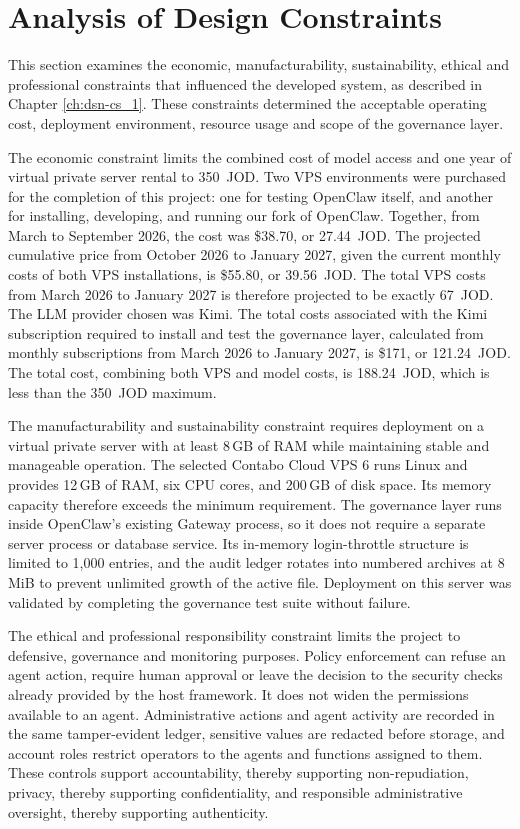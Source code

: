 \section{Analysis of Design Constraints}
\label{sec:gov-constraints}

This section examines the economic, manufacturability, sustainability, ethical
and professional constraints that influenced the developed system, as described in Chapter \ref{ch:dsn-cs_1}. These
constraints determined the acceptable operating cost, deployment environment,
resource usage and scope of the governance layer.

The economic constraint limits the combined cost of model access and one year of
virtual private server rental to 350~JOD. Two VPS environments were purchased for the completion of this project: one for testing OpenClaw itself, and another for installing, developing, and running our fork of OpenClaw. Together, from March to September 2026, the cost was \$38.70, or 27.44~JOD. The projected cumulative price from October 2026 to January 2027, given the current monthly costs of both VPS installations, is \$55.80, or 39.56~JOD. The total VPS costs from March 2026 to January 2027 is therefore projected to be exactly 67~JOD. 
The LLM provider chosen was Kimi. The total costs associated with the Kimi subscription required to install and test the governance layer, calculated from monthly subscriptions from March 2026 to January 2027, is \$171, or 121.24~JOD. The total cost, combining both VPS and model costs, is 188.24~JOD, which is less than the 350~JOD maximum.

The manufacturability and sustainability constraint requires deployment on a
virtual private server with at least 8\,GB of RAM while maintaining stable and
manageable operation. The selected Contabo Cloud VPS 6 runs Linux and provides
12\,GB of RAM, six CPU cores, and 200\,GB of disk space. Its memory capacity
therefore exceeds the minimum requirement. The governance layer runs
inside OpenClaw's existing Gateway process, so it does not require a separate
server process or database service. Its in-memory login-throttle structure is
limited to 1,000 entries, and the audit ledger rotates into numbered archives at
8\,MiB to prevent unlimited growth of the active file. Deployment on this server
was validated by completing the governance test suite without failure.

The ethical and professional responsibility constraint limits the project to
defensive, governance and monitoring purposes. Policy enforcement can refuse an
agent action, require human approval or leave the decision to the security checks
already provided by the host framework. It does not widen the permissions
available to an agent. Administrative actions and agent activity are recorded in
the same tamper-evident ledger, sensitive values are redacted before storage, and
account roles restrict operators to the agents and functions assigned to them.
These controls support accountability, thereby supporting non-repudiation, privacy, thereby supporting confidentiality, and responsible administrative
oversight, thereby supporting authenticity.

